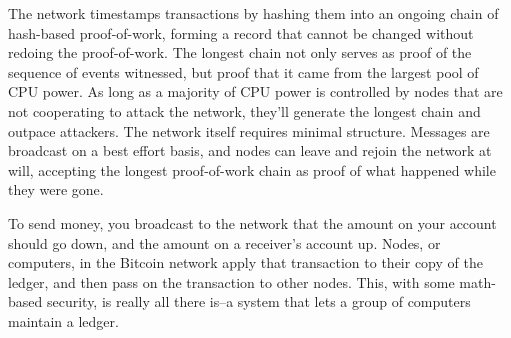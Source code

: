 The network timestamps transactions by hashing them into an ongoing chain of
hash-based proof-of-work, forming a record that cannot be changed without 
redoing the proof-of-work. The longest chain not only serves as proof of the 
sequence of events witnessed, but proof that it came from the largest pool of CPU 
power. As long as a majority of CPU power is controlled by nodes that are not 
cooperating to attack the network, they'll generate the longest chain and outpace 
attackers. The network itself requires minimal structure. Messages are broadcast on 
a best effort basis, and nodes can leave and rejoin the network at will, accepting the 
longest proof-of-work chain as proof of what happened while they were gone.

To send money, you broadcast to the network that the amount on your account 
should go down, and the amount on a receiver’s account up. Nodes, or computers,
in the Bitcoin network apply that transaction to their copy of the ledger, and then 
pass on the transaction to other nodes. This, with some math-based security, is 
really all there is--a system that lets a group of computers maintain a ledger.

%
%
%
\tableofcontents
%
%
\listoftables
%
%
\listoffigures
%
%
\mainmatter
%
%

